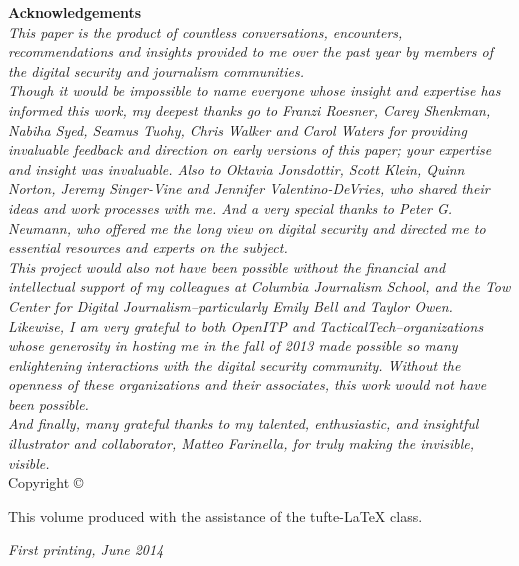 \documentclass[symmetric, notoc]{tufte-book}
\newcommand{\monthyear}{%
  \ifcase\month\or January\or February\or March\or April\or May\or June\or
  July\or August\or September\or October\or November\or
  December\fi\space\number\year
}
\begin{document}
\newpage
\null
\vfill
\begin{fullwidth}
\textsf{\textbf{Acknowledgements}} 
\\[1.0cm]
\noindent\textit{This paper is the product of countless conversations, encounters, recommendations and insights provided to me over the past year by members of the digital security and journalism communities.}\\[0.5cm]

\noindent\textit{Though it would be impossible to name everyone whose insight and expertise has informed this work, my deepest thanks go to Franzi Roesner, Carey Shenkman, Nabiha Syed, Seamus Tuohy, Chris Walker and Carol Waters for providing invaluable feedback and direction on early versions of this paper; your expertise and insight was invaluable. Also to Oktavia Jonsdottir, Scott Klein, Quinn Norton, Jeremy Singer-Vine and Jennifer Valentino-DeVries, who shared their ideas and work processes with me. And a very special thanks to Peter G. Neumann, who offered me the long view on digital security and directed me to essential resources and experts on the subject.} \\[0.5cm]

\noindent\textit{This project would also not have been possible without the financial and intellectual support of my colleagues at Columbia Journalism School, and the Tow Center for Digital Journalism--particularly Emily Bell and Taylor Owen. Likewise, I am very grateful to both OpenITP and TacticalTech--organizations whose generosity in hosting me in the fall of 2013 made possible so many enlightening interactions with the digital security community. Without the openness of these organizations and their associates, this work would not have been possible.} \\[0.5cm]

\noindent\textit{And finally, many grateful thanks to my talented, enthusiastic, and insightful illustrator and collaborator, Matteo Farinella, for truly making the invisible, visible.} \\[1.0cm]

\noindent \small{Copyright \copyright\ \the\year\ \thanklessauthor}

\noindent \small{This volume produced with the assistance of the \textsf{tufte-\LaTeX{}} class.}

\noindent\textit{First printing, June 2014}
\end{fullwidth}

\tableofcontents
\end{document}
